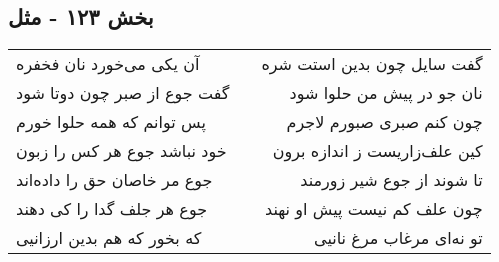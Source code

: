 \begin{center}
\section*{بخش ۱۲۳ - مثل}
\label{sec:sh123}
\begin{longtable}{l p{0.5cm} r}
آن یکی می‌خورد نان فخفره
&&
گفت سایل چون بدین استت شره
\\
گفت جوع از صبر چون دوتا شود
&&
نان جو در پیش من حلوا شود
\\
پس توانم که همه حلوا خورم
&&
چون کنم صبری صبورم لاجرم
\\
خود نباشد جوع هر کس را زبون
&&
کین علف‌زاریست ز اندازه برون
\\
جوع مر خاصان حق را داده‌اند
&&
تا شوند از جوع شیر زورمند
\\
جوع هر جلف گدا را کی دهند
&&
چون علف کم نیست پیش او نهند
\\
که بخور که هم بدین ارزانیی
&&
تو نه‌ای مرغاب مرغ نانیی
\\
\end{longtable}
\end{center}

